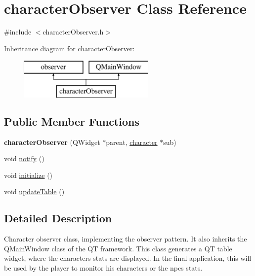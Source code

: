 \hypertarget{classcharacter_observer}{}\section{character\+Observer Class Reference}
\label{classcharacter_observer}


{\ttfamily \#include $<$character\+Observer.\+h$>$}

Inheritance diagram for character\+Observer\+:\begin{figure}[H]
\begin{center}
\leavevmode
\includegraphics[height=2.000000cm]{classcharacter_observer}
\end{center}
\end{figure}
\subsection*{Public Member Functions}
\begin{DoxyCompactItemize}
\item 
\hypertarget{classcharacter_observer_a076a0222ae36d51b761298ed5ae3ec71}{}\label{classcharacter_observer_a076a0222ae36d51b761298ed5ae3ec71} 
{\bfseries character\+Observer} (Q\+Widget $\ast$parent, \hyperlink{classcharacter}{character} $\ast$sub)
\item 
void \hyperlink{classcharacter_observer_acef1a20aefd63499e3cbcad9fdfd7e02}{notify} ()
\item 
void \hyperlink{classcharacter_observer_a617083ec4e753ede947c6a355df18dfe}{initialize} ()
\item 
void \hyperlink{classcharacter_observer_a1a3ec8b3be1a73dc89e413dc817a6077}{update\+Table} ()
\end{DoxyCompactItemize}


\subsection{Detailed Description}
Character observer class, implementing the observer pattern. It also inherits the Q\+Main\+Window class of the QT framework. This class generates a QT table widget, where the character\textquotesingle{}s stats are displayed. In the final application, this will be used by the player to monitor his character\textquotesingle{}s or the npc\textquotesingle{}s stats.

